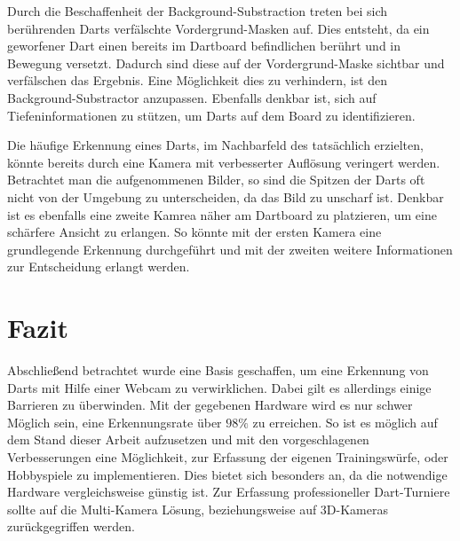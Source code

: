 Durch die Beschaffenheit der Background-Substraction treten bei sich berührenden Darts verfälschte Vordergrund-Masken auf. Dies entsteht, da ein geworfener Dart einen bereits im Dartboard befindlichen berührt und in Bewegung versetzt. Dadurch sind diese auf der Vordergrund-Maske sichtbar und verfälschen das Ergebnis.
Eine Möglichkeit dies zu verhindern, ist den Background-Substractor anzupassen. Ebenfalls denkbar ist, sich auf Tiefeninformationen zu stützen, um Darts auf dem Board zu identifizieren. 


Die häufige Erkennung eines Darts, im Nachbarfeld des tatsächlich erzielten, könnte bereits durch eine Kamera mit verbesserter Auflösung veringert werden. Betrachtet man die aufgenommenen Bilder, so sind die Spitzen der Darts oft nicht von der Umgebung zu unterscheiden, da das Bild zu unscharf ist. Denkbar ist es ebenfalls eine zweite Kamrea näher am Dartboard zu platzieren, um eine schärfere Ansicht zu erlangen. So könnte mit der ersten Kamera eine grundlegende Erkennung durchgeführt und mit der zweiten weitere Informationen zur Entscheidung erlangt werden. 

\section*{Fazit}
Abschließend betrachtet wurde eine Basis geschaffen, um eine Erkennung von Darts mit Hilfe einer Webcam zu verwirklichen. Dabei gilt es allerdings einige Barrieren zu überwinden. Mit der gegebenen Hardware wird es nur schwer Möglich sein, eine Erkennungsrate über $98\%$ zu erreichen. So ist es möglich auf dem Stand dieser Arbeit aufzusetzen und mit den vorgeschlagenen Verbesserungen eine Möglichkeit, zur Erfassung der eigenen Trainingswürfe, oder Hobbyspiele zu implementieren. Dies bietet sich besonders an, da die notwendige Hardware vergleichsweise günstig ist. Zur Erfassung professioneller Dart-Turniere sollte auf die Multi-Kamera Lösung, beziehungsweise auf 3D-Kameras zurückgegriffen werden.





